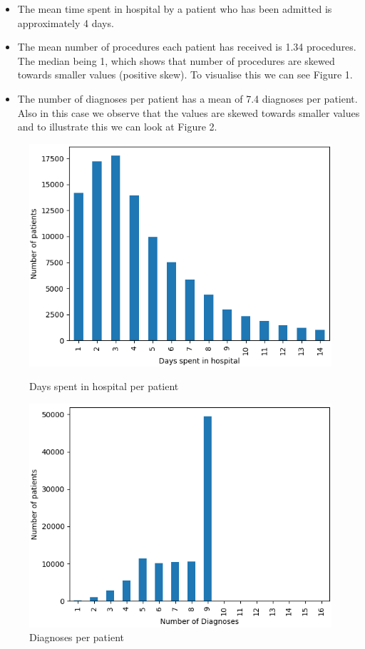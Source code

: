 \documentclass[11pt]{report}
\begin{document}
\begin{itemize}
	\item The mean time spent in hospital by a patient who has been admitted is approximately 4 days. 
	\item The mean number of procedures each patient has received is 1.34 procedures. The median being 1, which shows that number of procedures are skewed towards smaller values (positive skew). To visualise this we can see Figure 1.
	\item The number of diagnoses per patient has a mean of 7.4 diagnoses per patient. Also in this case we observe that the values are skewed towards smaller values and to illustrate this we can look at Figure 2. 
\end{itemize}

\begin{figure}[ht]
	\begin{minipage}[b]{.5\textwidth}
	\centering
	\includegraphics[width=1\textwidth]{tih_hist.png}
	\caption{Days spent in hospital per patient}
	\end{minipage}
	\hfill
	\begin{minipage}[b]{.5\textwidth}
	\centering
	\includegraphics[width=1\textwidth]{nod_bar.png}
\caption{Diagnoses per patient}
\end{minipage}
\end{figure}
\end{document}
